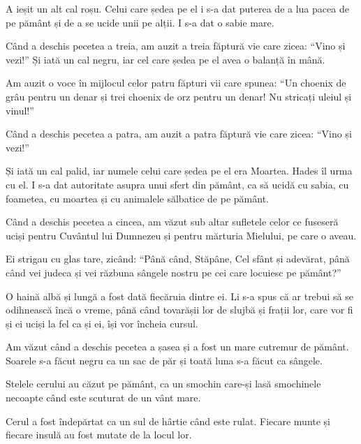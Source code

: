 {A ieșit un alt cal roșu. Celui care ședea pe el i s-a dat puterea de a lua pacea de pe pământ și de a se ucide unii pe alții. I s-a dat o sabie mare.


\par }{\PP {}Când a deschis pecetea a treia, am auzit a treia făptură vie care zicea: “Vino și vezi!” Și iată un cal negru, iar cel care ședea pe el avea o balanță în mână.

Am auzit o voce în mijlocul celor patru făpturi vii care spunea: “Un choenix
de grâu pentru un denar și trei choenix de orz pentru un denar! Nu stricați uleiul și vinul!”


\par }{\PP {}Când a deschis pecetea a patra, am auzit a patra făptură vie care zicea: “Vino și vezi!”

Și iată un cal palid, iar numele celui care ședea pe el era Moartea. Hades îl urma cu el. I s-a dat autoritate asupra unui sfert din pământ, ca să ucidă cu sabia, cu foametea, cu moartea și cu animalele sălbatice de pe pământ.


\par }{\PP {}Când a deschis pecetea a cincea, am văzut sub altar sufletele celor ce fuseseră uciși pentru Cuvântul lui Dumnezeu și pentru mărturia Mielului, pe care o aveau.

Ei strigau cu glas tare, zicând: “Până când, Stăpâne, Cel sfânt și adevărat, până când vei judeca și vei răzbuna sângele nostru pe cei care locuiesc pe pământ?”

O haină albă și lungă a fost dată fiecăruia dintre ei. Li s-a spus că ar trebui să se odihnească încă o vreme, până când tovarășii lor de slujbă și frații lor, care vor fi și ei uciși la fel ca și ei, își vor încheia cursul.


\par }{\PP {}Am văzut când a deschis pecetea a șasea și a fost un mare cutremur de pământ. Soarele s-a făcut negru ca un sac de păr și toată luna s-a făcut ca sângele.

Stelele cerului au căzut pe pământ, ca un smochin care-și lasă smochinele necoapte când este scuturat de un vânt mare.

Cerul a fost îndepărtat ca un sul de hârtie când este rulat. Fiecare munte și fiecare insulă au fost mutate de la locul lor.

}
